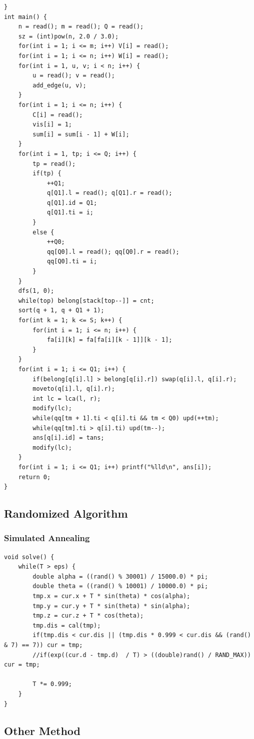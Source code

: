 \documentclass[10pt]{ctexart}
\begin{document}
{{\begin{lstlisting}
}
int main() {
    n = read(); m = read(); Q = read();
    sz = (int)pow(n, 2.0 / 3.0);
    for(int i = 1; i <= m; i++) V[i] = read();
    for(int i = 1; i <= n; i++) W[i] = read();
    for(int i = 1, u, v; i < n; i++) {
        u = read(); v = read();
        add_edge(u, v);
    }
    for(int i = 1; i <= n; i++) {
        C[i] = read();
        vis[i] = 1;
        sum[i] = sum[i - 1] + W[i];
    }
    for(int i = 1, tp; i <= Q; i++) {
        tp = read(); 
        if(tp) {
            ++Q1;
            q[Q1].l = read(); q[Q1].r = read();
            q[Q1].id = Q1;
            q[Q1].ti = i;
        }
        else {
            ++Q0;
            qq[Q0].l = read(); qq[Q0].r = read();
            qq[Q0].ti = i;
        }
    }
    dfs(1, 0);
    while(top) belong[stack[top--]] = cnt;
    sort(q + 1, q + Q1 + 1);
    for(int k = 1; k <= S; k++) {
        for(int i = 1; i <= n; i++) {
            fa[i][k] = fa[fa[i][k - 1]][k - 1];
        }
    }
    for(int i = 1; i <= Q1; i++) {
        if(belong[q[i].l] > belong[q[i].r]) swap(q[i].l, q[i].r);
        moveto(q[i].l, q[i].r);
        int lc = lca(l, r);
        modify(lc);
        while(qq[tm + 1].ti < q[i].ti && tm < Q0) upd(++tm);
        while(qq[tm].ti > q[i].ti) upd(tm--);
        ans[q[i].id] = tans;
        modify(lc);
    }
    for(int i = 1; i <= Q1; i++) printf("%lld\n", ans[i]);
    return 0;
}
\end{lstlisting}
\subsection{Randomized Algorithm}
\subsubsection{Simulated Annealing}
\begin{lstlisting}
void solve() {
    while(T > eps) {
        double alpha = ((rand() % 30001) / 15000.0) * pi;
        double theta = ((rand() % 10001) / 10000.0) * pi;
        tmp.x = cur.x + T * sin(theta) * cos(alpha);
        tmp.y = cur.y + T * sin(theta) * sin(alpha);
        tmp.z = cur.z + T * cos(theta);
        tmp.dis = cal(tmp);
        if(tmp.dis < cur.dis || (tmp.dis * 0.999 < cur.dis && (rand() & 7) == 7)) cur = tmp;
        //if(exp((cur.d - tmp.d)  / T) > ((double)rand() / RAND_MAX)) cur = tmp;

        T *= 0.999;
    }
}
\end{lstlisting}
\subsection{Other Method}
}}
\end{document}
